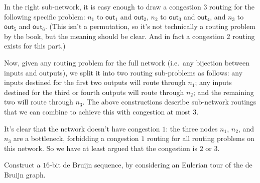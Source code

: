 \documentclass[12pt,twoside]{article}
\begin{document}
\begin{problem}{8}
{        In the right sub-network, it is easy enough to draw a congestion 3 routing for the following specific problem: $n_1$ to $\mathsf{out}_1$ and $\mathsf{out}_2$, $n_2$ to $\mathsf{out}_3$ and $\mathsf{out}_4$, and $n_3$ to $\mathsf{out}_5$ and $\mathsf{out}_6$. (This isn't a permutation, so it's not technically a routing problem by the book, but the meaning should be clear. And in fact a congestion 2 routing exists for this part.)

        Now, given any routing problem for the full network (i.e.\ any bijection between inputs and outputs), we split it into two routing sub-problems as follows: any inputs destined for the first two outputs will route through $n_1$; any inputs destined for the third or fourth outputs will route through $n_2$; and the remaining two will route through $n_3$. The above constructions describe sub-network routings that we can combine to achieve this with congestion at most $3$.

        It's clear that the network doesn't have congestion $1$: the three nodes $n_1$, $n_2$, and $n_3$ are a bottleneck, forbidding a congestion $1$ routing for all routing problems on this network. So we have at least argued that the congestion is $2$ or $3$.

    }

\end{problem}







\begin{problem}{10}
    Construct a $16$-bit de Bruijn sequence, by considering an Eulerian tour of the de Bruijn graph.


\end{problem}
\end{document}
